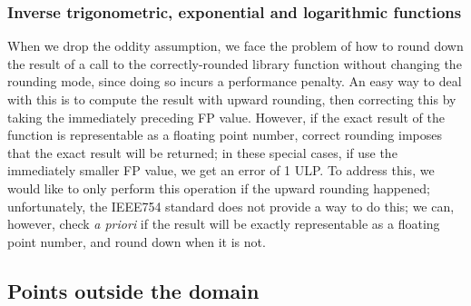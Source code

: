\subsubsection{Inverse trigonometric, exponential and logarithmic functions}
When we drop the oddity assumption, we face the problem of how to round down the result of a call to the correctly-rounded library function without changing the rounding mode, since doing so incurs a performance penalty.
An easy way to deal with this is to compute the result with upward rounding, then correcting this by taking the immediately preceding FP value.
However, if the exact result of the function is representable as a floating point number, correct rounding imposes that the exact result will be returned; in these special cases, if use the immediately smaller FP value, we get an error of 1 ULP.
To address this, we would like to only perform this operation if the upward rounding happened; unfortunately, the IEEE754 standard does not provide a way to do this; we can, however, check \emph{a priori} if the result will be exactly representable as a floating point number, and round down when it is not.

\FS{\dots}

\subsection{Points outside the domain}
